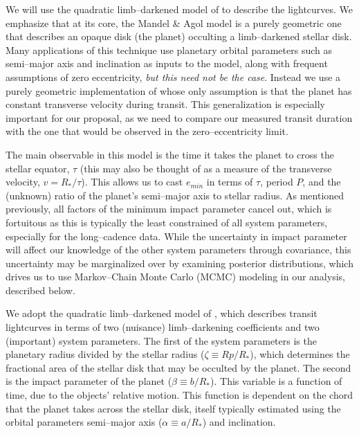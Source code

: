 We will use the quadratic limb--darkened model
of \cite{2002ApJ...580L.171M} to describe the lightcurves.  We
emphasize that at its core, the Mandel \& Agol model is a purely
geometric one that describes an opaque disk (the planet) occulting a
limb--darkened stellar disk.  Many applications of this technique use
planetary orbital parameters such as semi--major axis and inclination
as inputs to the model, along with frequent assumptions of zero
eccentricity, {\it but this need not be the case}.  Instead we use a
purely geometric implementation of \cite{2002ApJ...580L.171M} whose
only assumption is that the planet has constant transverse velocity
during transit.  This generalization is especially important for our
proposal, as we need to compare our measured transit duration with the
one that would be observed in the zero--eccentricity limit.

The main observable in this model is the time it takes the planet to
cross the stellar equator, $\tau$ (this may also be thought of as a
measure of the transverse velocity, $v = R_*/\tau$).  This allows us
to cast $e_{min}$ in terms of $\tau$, period $P$, and the (unknown)
ratio of the planet's semi--major axis to stellar radius.  As
mentioned previously, all factors of the minimum impact parameter
cancel out, which is fortuitous as this is typically the least
constrained of all system parameters, especially for the
long--cadence \kepler data.  While the uncertainty in impact parameter
will affect our knowledge of the other system parameters through
covariance, this uncertainty may be marginalized over by examining
posterior distributions, which drives us to use Markov--Chain Monte
Carlo (MCMC) modeling in our analysis, described below.


\medskip
{\centerline{}}
\smallskip


We adopt the quadratic limb--darkened model
of \cite{2002ApJ...580L.171M}, which describes transit lightcurves in
terms of two (nuisance) limb--darkening coefficients and two
(important) system parameters.  The first of the system parameters is
the planetary radius divided by the stellar radius ($\zeta \equiv
Rp/R_*$), which determines the fractional area of the stellar disk
that may be occulted by the planet.  The second is the impact
parameter of the planet ($\beta \equiv b/R_*$).  This variable is a
function of time, due to the objects' relative motion.  This function
is dependent on the chord that the planet takes across the stellar
disk, itself typically estimated using the orbital parameters
semi--major axis ($\alpha \equiv a/R_*$) and inclination.

